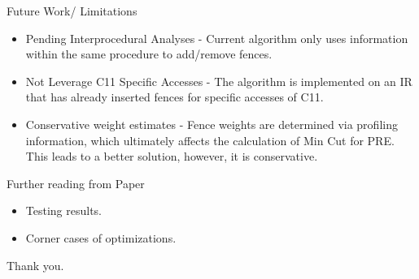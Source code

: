 \documentclass[notes, xcolor=dvipsnames]{beamer}
\begin{document}
    \begin{frame}{Future Work/ Limitations}

        \begin{itemize}
            \item Pending Interprocedural Analyses - Current algorithm only uses information within the same procedure to add/remove fences.
            \item Not Leverage C11 Specific Accesses - The algorithm is implemented on an IR that has already inserted fences for specific accesses of C11. 
            \item Conservative weight estimates - Fence weights are determined via profiling information, which ultimately affects the calculation of Min Cut for PRE. This leads to a better solution, however, it is conservative. 
        \end{itemize}
        
    \end{frame}

    \begin{frame}{Further reading from Paper}

        \begin{itemize}
            \item Testing results.
            \item Corner cases of optimizations.
        \end{itemize}
        

        Thank you. 
    \end{frame}
\end{document}
